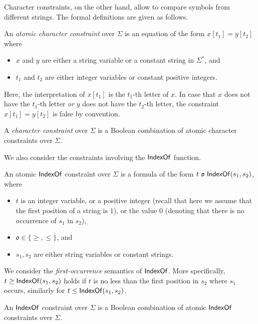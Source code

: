 Character constraints, on the other hand, allow to compare symbols from different strings. The formal definitions are given as follows. 

\begin{definition}
	An \emph{atomic character constraint} over $\Sigma$ is an equation of the form $x[t_1]=y[t_2]$ where 
	\begin{itemize}
		\item $x$ and $y$ are either a string variable or a constant string in $\Sigma^*$, and 
		\item $t_1$ and $t_2$ are either integer variables or constant positive integers.
	\end{itemize} 
Here, the interpretation of $x[t_1]$ is the $t_1$-th letter of $x$. In case that $x$ does not have the $t_1$-th letter \emph{or} $y$ does not have the $t_2$-th letter, the constraint $x[t_1] = y[t_2]$ is false by convention.  
	
A \emph{character constraint} over $\Sigma$ is a Boolean combination of atomic character constraints over $\Sigma$. 
\end{definition}

We also consider the constraints involving the $\mathsf{IndexOf}$ function.

\begin{definition}
An atomic $\mathsf{IndexOf}$ constraint over $\Sigma$ is a formula of the form $t\ \mathfrak{o}\ \indexof(s_1, s_2)$, where 
\begin{itemize}
\item $t$ is an integer variable, or a positive integer (recall that here we assume that the first position of a string is $1$), or the value $0$ (denoting that there is no occurrence of $s_1$ in $s_2$), 
\item $\mathfrak{o} \in \{\ge, \le\}$, and
%
\item  $s_1,s_2$ are either string variables or constant strings. 
\end{itemize}
We consider the \emph{first-occurrence} semantics of $\mathsf{IndexOf}$.  More specifically, $t \ge \mathsf{IndexOf}(s_1, s_2)$ holds if $t$ is no less than the first position in $s_2$ where $s_1$ occurs, similarly for $t \le \mathsf{IndexOf}(s_1, s_2)$.

An $\mathsf{IndexOf}$ constraint over $\Sigma$ is a Boolean combination of atomic $\mathsf{IndexOf}$ constraints over $\Sigma$.
\end{definition}

